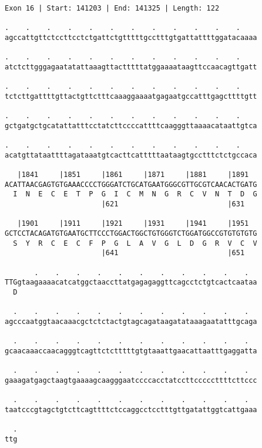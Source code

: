 \documentclass{article}
\begin{document}
\begin{Verbatim}
Exon 16 | Start: 141203 | End: 141325 | Length: 122
 
.    .    .    .    .    .    .    .    .    .    .    .    
agccattgttctccttcctctgattctgtttttgcctttgtgattattttggatacaaaa
  
.    .    .    .    .    .    .    .    .    .    .    .    
atctcttgggagaatatattaaagttactttttatggaaaataagttccaacagttgatt
  
.    .    .    .    .    .    .    .    .    .    .    .    
tctcttgattttgttactgttctttcaaaggaaaatgagaatgccatttgagcttttgtt
  
.    .    .    .    .    .    .    .    .    .    .    .    
gctgatgctgcatattatttcctatcttccccattttcaagggttaaaacataattgtca
  
.    .    .    .    .    .    .    .    .    .    .    .    
acatgttataattttagataaatgtcacttcatttttaataagtgcctttctctgccaca
  
   |1841     |1851     |1861     |1871     |1881     |1891  
ACATTAACGAGTGTGAAACCCCTGGGATCTGCATGAATGGGCGTTGCGTCAACACTGATG
  I  N  E  C  E  T  P  G  I  C  M  N  G  R  C  V  N  T  D  G
                       |621                          |631   
  
   |1901     |1911     |1921     |1931     |1941     |1951  
GCTCCTACAGATGTGAATGCTTCCCTGGACTGGCTGTGGGTCTGGATGGCCGTGTGTGTG
  S  Y  R  C  E  C  F  P  G  L  A  V  G  L  D  G  R  V  C  V
                       |641                          |651   
  
       .    .    .    .    .    .    .    .    .    .    .  
TTGgtaagaaaacatcatggctaaccttatgagagaggttcagcctctgtcactcaataa
  D                                                         
  
  .    .    .    .    .    .    .    .    .    .    .    .  
agcccaatggtaacaaacgctctctactgtagcagataagatataaagaatatttgcaga
  
  .    .    .    .    .    .    .    .    .    .    .    .  
gcaacaaaccaacagggtcagttctctttttgtgtaaattgaacattaatttgaggatta
  
  .    .    .    .    .    .    .    .    .    .    .    .  
gaaagatgagctaagtgaaaagcaagggaatccccacctatccttcccccttttcttccc
  
  .    .    .    .    .    .    .    .    .    .    .    .  
taatcccgtagctgtcttcagttttctccaggcctcctttgttgatattggtcattgaaa
  
  .
ttg
\end{Verbatim}
\newpage
\end{document}
